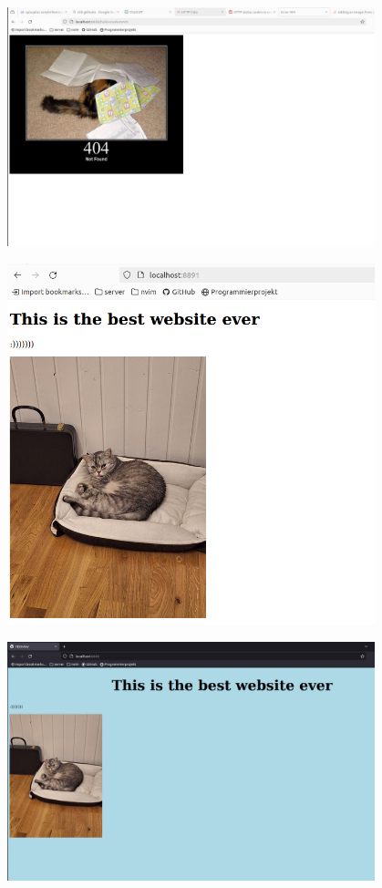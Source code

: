\documentclass[aspectratio=169]{beamer}
\begin{document}
\begin{frame}[c]{}
  \centering
\includegraphics[width=0.8\textwidth]{02_http_cats.png}
\end{frame}

\begin{frame}[c]{}
  \centering
\includegraphics[width=0.8\textwidth]{03_html_mit_bild.png}
\end{frame}

\begin{frame}[c]{}
  \centering
\includegraphics[width=0.8\textwidth]{04_somecss.png}
\end{frame}
\end{document}
